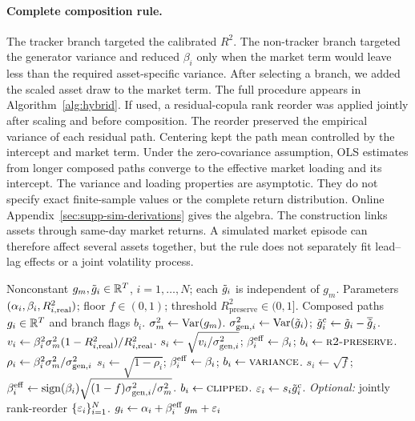\paragraph{Complete composition rule.}

The tracker branch targeted the calibrated $R^2$. The non-tracker
branch targeted the generator variance and reduced $\beta_i$ only when
the market term would leave less than the required asset-specific
variance. After selecting a branch, we added the scaled asset draw to
the market term. The full procedure appears in
Algorithm~\ref{alg:hybrid}. If used, a residual-copula rank reorder was
applied jointly after scaling and before composition. The reorder
preserved the empirical variance of each residual path.
Centering kept the path mean controlled by the intercept and market
term. Under the zero-covariance assumption, OLS estimates from longer
composed paths converge to the effective market loading and its
intercept. The variance and loading properties are asymptotic. They
do not specify exact finite-sample values or the complete return
distribution. Online Appendix~\ref{sec:supp-sim-derivations} gives the algebra. The
construction links assets through same-day market returns. A simulated
market episode can therefore affect several assets together, but the
rule does not separately fit lead--lag effects or a joint volatility
process.

\begin{algorithm}[t]
\caption{Hybrid single-index model (SIM) composition with variance correction.}
\label{alg:hybrid}
\small
\begin{algorithmic}[1]
  \REQUIRE Nonconstant $g_m,\tilde{g}_i\in\mathbb{R}^T$, $i=1,\dots,N$; each
    $\tilde{g}_i$ is independent of $g_m$.
  \REQUIRE Parameters $(\alpha_i,\beta_i,R^2_{i,\mathrm{real}})$; floor
    $f\in(0,1)$; threshold $R^2_{\mathrm{preserve}}\in(0,1]$.
  \ENSURE Composed paths $g_i\in\mathbb{R}^T$ and branch flags $b_i$.
  \STATE $\sigma_m^2 \gets \operatorname{Var}(g_m)$.
    \STATE $\sigma_{\mathrm{gen},i}^2 \gets \operatorname{Var}(\tilde{g}_i)$;
      $\tilde{g}_i^{\mathrm c} \gets \tilde{g}_i-\overline{\tilde{g}}_i$.
      \STATE $v_i \gets \beta_i^2\sigma_m^2(1-R^2_{i,\mathrm{real}})/R^2_{i,\mathrm{real}}$.
      \STATE $s_i \gets \sqrt{v_i/\sigma_{\mathrm{gen},i}^2}$;
        $\beta_i^{\mathrm{eff}} \gets \beta_i$; $b_i\gets\textsc{r2-preserve}$.
    \ELSE
      \STATE $\rho_i \gets \beta_i^2 \sigma_m^2 / \sigma_{\mathrm{gen},i}^2$
        \STATE $s_i \gets \sqrt{1-\rho_i}$;
          $\beta_i^{\mathrm{eff}}\gets\beta_i$; $b_i\gets\textsc{variance}$.
      \ELSE
        \STATE $s_i\gets\sqrt{f}$;
          $\beta_i^{\mathrm{eff}}\gets\operatorname{sign}(\beta_i)
          \sqrt{(1-f)\sigma_{\mathrm{gen},i}^2/\sigma_m^2}$.
        \STATE $b_i\gets\textsc{clipped}$.
      \ENDIF
    \ENDIF
    \STATE $\varepsilon_i \gets s_i\tilde{g}_i^{\mathrm c}$.
  \ENDFOR
  \STATE \textit{Optional:} jointly rank-reorder $\{\varepsilon_i\}_{i=1}^{N}$.
    \STATE $g_i \gets \alpha_i + \beta_i^{\mathrm{eff}}\, g_m + \varepsilon_i$
      \hfill {}
  \ENDFOR
\end{algorithmic}
\end{algorithm}

